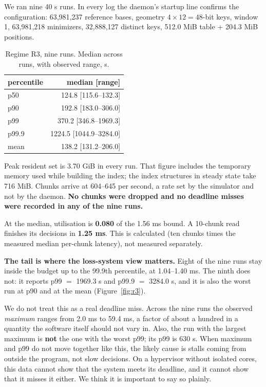 \documentclass[conference]{IEEEtran}
\begin{document}
We ran nine 40 s runs. In every log the daemon's startup line confirms the configuration:
63,981,237 reference bases, geometry $4 \times 12 = 48$-bit keys, window 1, 63,981,218
minimizers, 32,888,127 distinct keys, 512.0 MiB table + 204.3 MiB positions.

\begin{table}[t]
\caption{Regime R3, nine runs. Median across runs, with observed range, \textmu{}s.}
\label{tab:r3}
\centering
\footnotesize
\begin{tabular}{lr}
\toprule
percentile & median [range] \\
\midrule
p50   & 124.8 [115.6--132.3] \\
p90   & 192.8 [183.0--306.0] \\
p99   & 370.2 [346.8--1969.3] \\
p99.9 & 1224.5 [1044.9--3284.0] \\
mean  & 138.2 [131.2--206.0] \\
\bottomrule
\end{tabular}
\end{table}

Peak resident set is 3.70 GiB in every run. That figure includes the temporary memory used while
building the index; the index structures in steady state take 716 MiB. Chunks arrive at
604--645 per second, a rate set by the simulator and not by the daemon. \textbf{No chunks were
dropped and no deadline misses were recorded in any of the nine runs.}

At the median, utilisation is \textbf{0.080} of the 1.56 ms bound. A 10-chunk read finishes its
decisions in \textbf{1.25 ms}. This is calculated (ten chunks times the measured median per-chunk
latency), not measured separately.

\textbf{The tail is where the loss-system view matters.} Eight of the nine runs stay inside the
budget up to the 99.9th percentile, at 1.04--1.40 ms. The ninth does not: it reports
p99 $=$ 1969.3 \textmu{}s and p99.9 $=$ 3284.0 \textmu{}s, and it is also the worst run at p90 and
at the mean (Figure~\ref{fig:r3}).

We do not treat this as a real deadline miss. Across the nine runs the observed \emph{maximum}
ranges from 2.0 ms to 59.4 ms, a factor of about a hundred in a quantity the software itself
should not vary in. Also, the run with the largest maximum is \textbf{not} the one with the worst
p99; its p99 is 630 \textmu{}s. When maximum and p99 do not move together like this, the likely
cause is stalls coming from outside the program, not slow decisions. On a hypervisor without
isolated cores, this data cannot show that the system meets its deadline, and it cannot show
that it misses it either. We think it is important to say so plainly.
\end{document}
